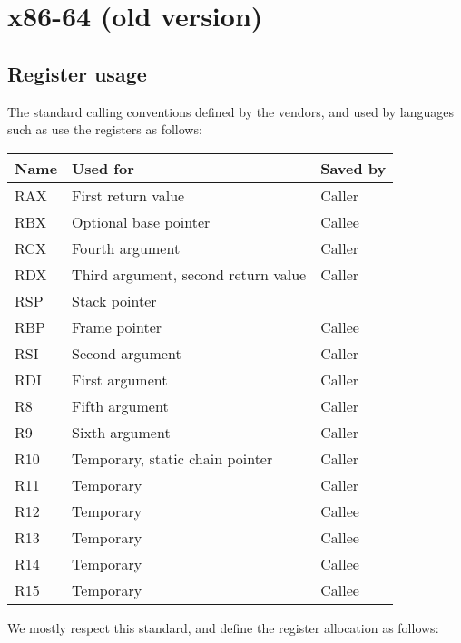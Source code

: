 \chapter{x86-64 (old version)}
\label{chapter-backend-x86-64-old}

\section{Register usage}
\label{sec-backend-x86-64-register-use}

The standard calling conventions defined by the vendors, and used by
languages such as \clanguage{} use the registers as follows:

\begin{tabular}{|l|l|l|}
\hline
Name & Used for & Saved by\\
\hline
\hline
RAX & First return value & Caller\\
RBX & Optional base pointer & Callee\\
RCX & Fourth argument & Caller \\
RDX & Third argument, second return value & Caller\\
RSP & Stack pointer &\\
RBP & Frame pointer & Callee\\
RSI & Second argument & Caller\\
RDI & First argument & Caller\\
R8 & Fifth argument & Caller\\
R9 & Sixth argument & Caller\\
R10 & Temporary, static chain pointer & Caller\\
R11 & Temporary & Caller\\
R12 & Temporary & Callee\\
R13 & Temporary & Callee\\
R14 & Temporary & Callee\\
R15 & Temporary & Callee\\
\hline
\end{tabular}

We mostly respect this standard, and define the register allocation as
follows:

